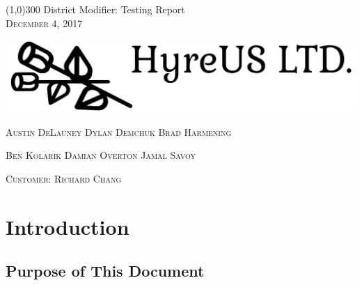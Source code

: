 \documentclass{article}
\begin{document}
\begin{titlepage}

	\begin{center}
 	\line(1,0){300} 
 	\huge{ District Modifier: Testing Report} \\
 	
 	\vspace{1mm} 
 	\textsc{\normalsize December 4, 2017}
 	
 	\vspace{10mm}
	
	\hspace*{-2cm}   
	\includegraphics[scale=.25]{Logo.png}

	\vspace{10mm}
 
 	\textsc{\normalsize Austin DeLauney \quad Dylan Demchuk \quad Brad Harmening}
 	
 	\vspace{2mm}
 	
 	\textsc{\normalsize Ben Kolarik \quad Damian Overton \quad Jamal Savoy}
 
 	\vspace{2mm}
 	
 	\textsc{\normalsize Customer: Richard Chang}
 
 
 	\thispagestyle{empty}
 	
 \end{center}
 \end{titlepage}




\tableofcontents
\thispagestyle{empty}
\cleardoublepage

\setcounter{page}{1}



\section{Introduction}\label{sec:intro}


\subsection{Purpose of This Document}
\end{document}
